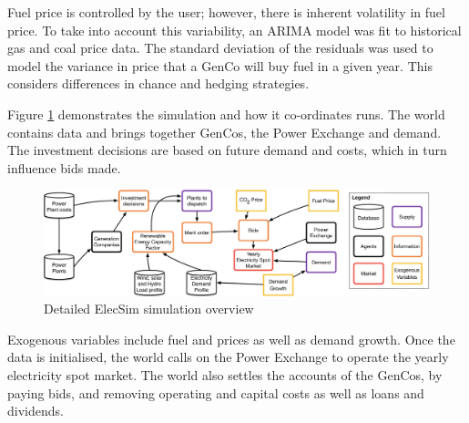 Fuel price is controlled by the user; however, there is inherent volatility in fuel price. To take into account this variability, an ARIMA \cite{ARIMA} model was fit to historical gas and coal price data. The standard deviation of the residuals was used to model the variance in price that a GenCo will buy fuel in a given year. This considers differences in chance and hedging strategies.



Figure \ref{fig:lowlevelsystem} demonstrates the simulation and how it co-ordinates runs. The world contains data and brings together GenCos, the Power Exchange and demand. The investment decisions are based on future demand and costs, which in turn influence bids made.

\begin{landscape}
	\begin{figure}
		\centering
		\includegraphics[width=\linewidth]{Chapter4/figures/low_level_system}
		\caption{Detailed ElecSim simulation overview}
		\label{fig:lowlevelsystem}
	\end{figure}
\end{landscape}

Exogenous variables include fuel and  prices as well as demand growth. Once the data is initialised, the world calls on the Power Exchange to operate the yearly electricity spot market. The world also settles the accounts of the GenCos, by paying bids, and removing operating and capital costs as well as loans and dividends.







